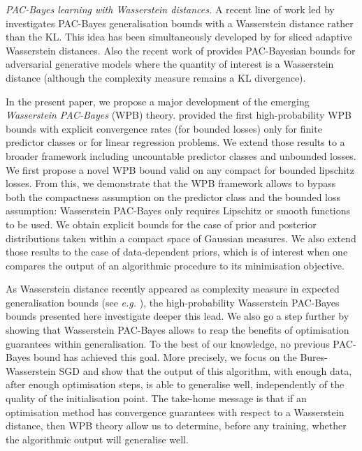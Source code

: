 \textit{PAC-Bayes learning with Wasserstein distances.}
A recent line of work led by \citet{amit2022integral} investigates PAC-Bayes generalisation bounds with a Wasserstein distance rather than the KL. This idea has been simultaneously developed by \citet{ohana2023shedding} for sliced adaptive Wasserstein distances.
Also the recent work of \citet{mbacke2023pacbayesian} provides PAC-Bayesian bounds for adversarial generative models where the quantity of interest is a Wasserstein distance (although the complexity measure remains a KL divergence).

In the present paper, we propose a major development of the emerging \emph{Wasserstein PAC-Bayes} (WPB) theory.
\citet{amit2022integral} provided the first high-probability WPB bounds with explicit convergence rates (for bounded losses) only for finite predictor classes or for linear regression problems. We extend those results to a broader framework including uncountable predictor classes and unbounded losses. We first propose a novel  WPB bound valid on any compact for bounded lipschitz losses. From this, we demonstrate that the WPB framework allows to bypass both the compactness assumption on the predictor class and the bounded loss assumption: Wasserstein PAC-Bayes only requires Lipschitz or smooth functions to be used. We obtain explicit bounds for the case of prior and posterior distributions taken within a compact space of Gaussian measures.
We also extend those results to the case of data-dependent priors, which is of interest when one compares the output of an algorithmic procedure to its minimisation objective.


As Wasserstein distance recently appeared as complexity measure in expected generalisation bounds (see \emph{e.g.} \citealp{rodriguez2021tighter}), the high-probability Wasserstein PAC-Bayes bounds presented here investigate deeper this lead. We also go a step further by showing that Wasserstein PAC-Bayes allows to reap the benefits of optimisation guarantees within generalisation. To the best of our knowledge, no previous PAC-Bayes bound has achieved this goal.
More precisely, we focus on the Bures-Wasserstein SGD \citep{altschuler2021aver,lambert2022variational} and show that the output of this algorithm, with enough data, after enough optimisation steps, is able to generalise well, independently of the quality of the initialisation point. The take-home message is that if an optimisation method has convergence guarantees with respect to a Wasserstein distance, then WPB theory allow us to determine, before any training, whether the algorithmic output will generalise well.

